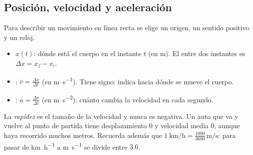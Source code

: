 \documentclass[11pt,a4paper]{article}
\begin{document}
\subsection{Posición, velocidad y aceleración}
Para describir un movimiento en línea recta se elige un origen, un sentido positivo y un reloj.
\begin{definicion}
\begin{itemize}
\item {} $x(t)$: dónde está el cuerpo en el instante $t$ (en \si{\meter}).
      El  entre dos instantes es $\Delta x=x_f-x_i$.
\item {}: $\displaystyle \bar v=\frac{\Delta x}{\Delta t}$ (en \si{\meter\per\second}).
      Tiene signo: indica hacia dónde se mueve el cuerpo.
\item {}: $\displaystyle \bar a=\frac{\Delta v}{\Delta t}$ (en \si{\meter\per\second\squared}):
      cuánto cambia la velocidad en cada segundo.
\end{itemize}
\end{definicion}
\begin{ojo}
La \emph{rapidez} es el tamaño de la velocidad y nunca es negativa. Un auto que va y vuelve al punto de partida
tiene desplazamiento $0$ y velocidad media $0$, aunque haya recorrido muchos metros.
Recuerda además que $\SI{1}{\kilo\meter\per\hour}=\tfrac{1000}{3600}\,\si{\meter\per\second}$: para pasar de
\si{\kilo\meter\per\hour} a \si{\meter\per\second} se divide entre $3.6$.
\end{ojo}
\end{document}
